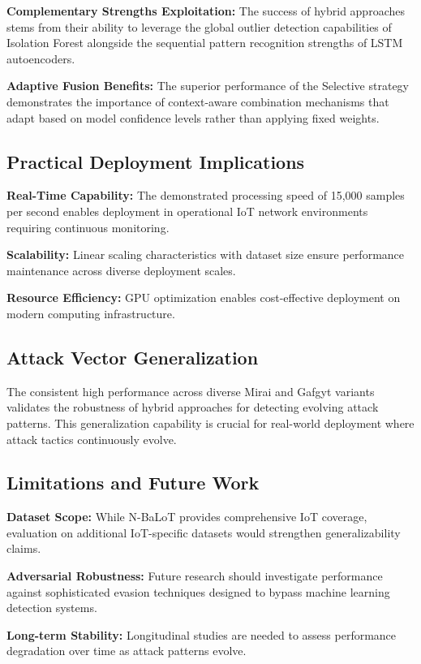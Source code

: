 \documentclass[conference]{IEEEtran}
\begin{document}
\textbf{Complementary Strengths Exploitation:} The success of hybrid approaches stems from their ability to leverage the global outlier detection capabilities of Isolation Forest alongside the sequential pattern recognition strengths of LSTM autoencoders.

\textbf{Adaptive Fusion Benefits:} The superior performance of the Selective strategy demonstrates the importance of context-aware combination mechanisms that adapt based on model confidence levels rather than applying fixed weights.

\subsection{Practical Deployment Implications}

\textbf{Real-Time Capability:} The demonstrated processing speed of 15,000 samples per second enables deployment in operational IoT network environments requiring continuous monitoring.

\textbf{Scalability:} Linear scaling characteristics with dataset size ensure performance maintenance across diverse deployment scales.

\textbf{Resource Efficiency:} GPU optimization enables cost-effective deployment on modern computing infrastructure.

\subsection{Attack Vector Generalization}

The consistent high performance across diverse Mirai and Gafgyt variants validates the robustness of hybrid approaches for detecting evolving attack patterns. This generalization capability is crucial for real-world deployment where attack tactics continuously evolve.

\subsection{Limitations and Future Work}

\textbf{Dataset Scope:} While N-BaLoT provides comprehensive IoT coverage, evaluation on additional IoT-specific datasets would strengthen generalizability claims.

\textbf{Adversarial Robustness:} Future research should investigate performance against sophisticated evasion techniques designed to bypass machine learning detection systems.

\textbf{Long-term Stability:} Longitudinal studies are needed to assess performance degradation over time as attack patterns evolve.
\end{document}
